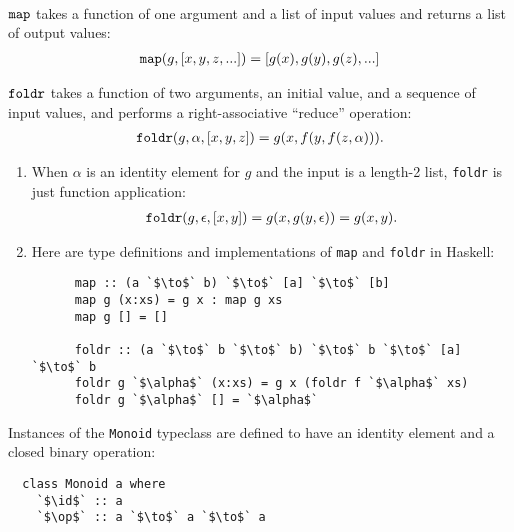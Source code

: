 \documentclass[12pt]{article}
\newcommand{\map}{\text{{\tt map}}}
\newcommand{\foldr}{\text{{\tt foldr}}}
\newcommand{\op}{\oplus}
\newcommand{\id}{\epsilon}
\begin{document}
\begin{definition*}[$\map$, $\foldr$]\hspace{0pt}\\
  $\map$ takes a function of one argument and a list of input values and returns a list of output
  values:
  \begin{align*}
    \map(g, [x, y, z, ...]) = [g(x), g(y), g(z), ...]
  \end{align*}

  $\foldr$ takes a function of two arguments, an initial value, and a sequence of input values, and
  performs a right-associative ``reduce'' operation:
  \begin{align*}
    \foldr(g, \alpha, [x, y, z]) = g(x, f(y, f(z, \alpha))).
  \end{align*}
\end{definition*}

\begin{remark*}\hspace{0pt}
  \begin{enumerate}
  \item When $\alpha$ is an identity element for $g$ and the input is a length-2 list, {\tt foldr}
    is just function application:
  \begin{align*}
    \foldr(g, \id, [x, y]) = g(x, g(y, \id)) = g(x, y).
  \end{align*}
\item   Here are type definitions and implementations of {\tt map} and {\tt foldr} in Haskell:
  \begin{normalfont}
    \begin{verbatim}
      map :: (a `$\to$` b) `$\to$` [a] `$\to$` [b]
      map g (x:xs) = g x : map g xs
      map g [] = []

      foldr :: (a `$\to$` b `$\to$` b) `$\to$` b `$\to$` [a] `$\to$` b
      foldr g `$\alpha$` (x:xs) = g x (foldr f `$\alpha$` xs)
      foldr g `$\alpha$` [] = `$\alpha$`
    \end{verbatim}
  \end{normalfont}
  \end{enumerate}
\end{remark*}

Instances of the {\tt Monoid} typeclass are defined to have an identity element and a closed binary
operation:
\begin{verbatim}
  class Monoid a where
    `$\id$` :: a
    `$\op$` :: a `$\to$` a `$\to$` a
\end{verbatim}
\end{document}
